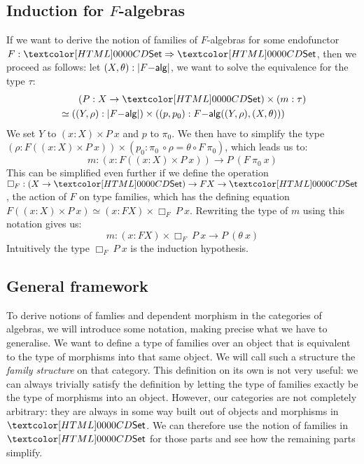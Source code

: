 \subsection{Induction for $F$-algebras}
If we want to derive the notion of families of $F$-algebras for some
endofunctor $F : \Func{\Set}{\Set}$, then we proceed as follows: let
$(X,\theta) : | F\mathsf{-alg} |$, we want to solve the equivalence for
the type $\tau$:
%
\begin{align*}
&\ \ \ \ \ \ (P : X \to \Set) \times (m : \tau) \\
&\simeq ((Y,\rho) : | \algcat{F} |) \times ((p,p_0) : \algcat{F}((Y,\rho),(X,\theta)))  
\end{align*}
%
We set $Y$ to $(x : X) \times P\ x$ and $p$ to $\pi_0$. We then have
to simplify the type
$(\rho : F ((x : X) \times P\ x)) \times (p_0 : \pi_0\ \circ \rho =
\theta \circ F\ \pi_0)$, which leads us to:
$$
m : (x : F ((x : X) \times P\ x)) \to P\ (F\ \pi_0\ x)
$$
This can be simplified even further if we define the operation
$\Box_F : (X \to \Set) \to FX \to \Set$, \ie the action of $F$ on type
families, which has the defining equation
$F ((x : X) \times P\ x) \simeq (x : FX) \times \Box_F\ P\
x$. Rewriting the type of $m$ using this notation gives us:
$$
m : (x : FX) \times \Box_F\ P\ x \to P\ (\theta\ x)
$$
Intuitively the type $\Box_F\ P\ x$ is the induction hypothesis.

\subsection{General framework}

To derive notions of famlies and dependent morphism in the categories
of algebras, we will introduce some notation, making precise what we
have to generalise. We want to define a type of families over an
object that is equivalent to the type of morphisms into that same
object. We will call such a structure the \emph{family structure} on
that category. This definition on its own is not very useful: we can
always trivially satisfy the definition by letting the type of
families exactly be the type of morphisms into an object. However, our
categories are not completely arbitrary: they are always in some way
built out of objects and morphisms in $\Set$. We can therefore use the
notion of families in $\Set$ for those parts and see how the remaining
parts simplify.

